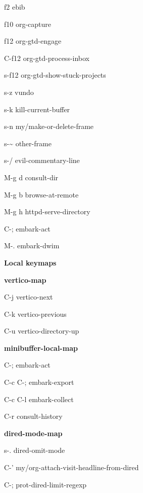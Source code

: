 \documentclass[10pt]{article}
\renewcommand\section[1]{\bigskip\par\textbf{\color{heading}\large#1}\smallskip}
\renewcommand\subsection[1]{\smallskip\par\textbf{\color{heading}#1}}
\begin{document}
\begin{multicols}{4}
\begin{keylist}
    \item[f2] ebib

    \item[f10] org-capture

    \item[f12] org-gtd-engage
    \item[C-f12] org-gtd-process-inbox
    \item[s-f12] org-gtd-show-stuck-projects

    \item[s-z] vundo
    \item[s-k] kill-current-buffer
    \item[s-n] my/make-or-delete-frame
    \item[s-\~] other-frame
    \item[s-/] evil-commentary-line

    \item[M-g d] consult-dir
    \item[M-g b] browse-at-remote
    \item[M-g h] httpd-serve-directory
    \item[C-;] embark-act
    \item[M-.] embark-dwim
  \end{keylist}

  \section{Local keymaps}
  \subsection{vertico-map}
  \begin{keylist}
    \item[C-j] vertico-next
    \item[C-k] vertico-previous
    \item[C-u] vertico-directory-up
  \end{keylist}
  \subsection{minibuffer-local-map}
  \begin{keylist}
    \item[C-;] embark-act
    \item[C-c C-;] embark-export
    \item[C-c C-l] embark-collect

    \item[C-r] consult-history
  \end{keylist}

  \subsection{dired-mode-map}
  \begin{keylist}
    \item[s-.] dired-omit-mode
    \item[C-'] my/org-attach-visit-headline-from-dired
    \item[C-;] prot-dired-limit-regexp
    \end{keylist}

  \end{multicols}
\end{document}

